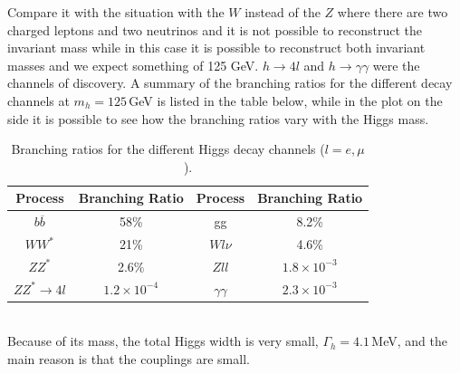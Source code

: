 \documentclass[../main.tex]{subfiles}
\begin{document}
Compare it with the situation with the $W$ instead of the $Z$ where there are two charged leptons and two neutrinos and it is not possible to reconstruct the invariant  mass while in this case it is possible to reconstruct both invariant masses and we expect something of 125 GeV. $h\to4l$ and $h\to\gamma\gamma$ were the channels of discovery. A summary of the branching ratios for the different decay channels at $m_h=125$\,GeV is listed in the table below, while in the plot on the side it is possible to see how the branching ratios vary with the Higgs mass.
\begin{table}[h]
    \centering
    \begin{tabular}{c|c||c|c}
    \hline
    \rowcolor{blue!45}Process & Branching Ratio & Process & Branching Ratio\\
    \hline
    $b\overline{b}$ & 58\% & gg & 8.2\%\\
    $WW^*$ & 21\% & $Wl\nu$ & 4.6\%\\
    $ZZ^*$ & 2.6\% & $Zll$ & $1.8\times10^{-3}$\\
    $ZZ^*\to4l$ & $1.2\times10^{-4}$ & $\gamma\gamma$ & $2.3\times10^{-3}$\\
    \hline
    \end{tabular}
    \caption{Branching ratios for the different Higgs decay channels ($l=e,\mu$).}
\end{table}\\
Because of its mass, the total Higgs width is very small,  $\Gamma_h=4.1$\,MeV, and the main reason is that the couplings are small.
\end{document}
